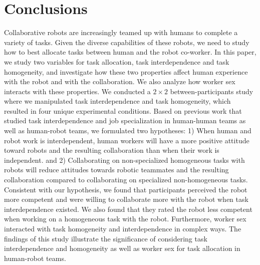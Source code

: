 \section{Conclusions}
       Collaborative robots are increasingly teamed up with humans to complete a variety of tasks. Given the diverse capabilities of these robots, we need to study how to best allocate tasks between human and the robot co-worker. In this paper, we study two variables for task allocation, task interdependence and task homogeneity, and investigate how these two properties affect human experience with the robot and with the collaboration. We also analyze how worker sex interacts with these properties. We conducted a $2\times2$ between-participants study where we manipulated task interdependence and task homogeneity, which resulted in four unique experimental conditions. Based on previous work that studied task interdependence and job specialization in  human-human teams as well as human-robot teams, we formulated two hypotheses: 1) When human and robot work is interdependent, human workers will have a more positive attitude toward robots and the resulting collaboration than when their work is independent. and 2) Collaborating on non-specialized homogeneous tasks with robots will reduce attitudes towards robotic teammates and the resulting collaboration compared to collaborating on specialized non-homogeneous tasks. Consistent with our hypothesis, we found that participants perceived the robot more competent and were willing to collaborate more with the robot when task interdependence existed. We also found that they rated the robot less competent when working on a homogeneous task  with the robot. Furthermore,  worker sex interacted with task homogeneity and interdependence in complex ways. The findings of this study illustrate the significance of considering task interdependence and homogeneity  as well as worker sex for task allocation in human-robot teams.